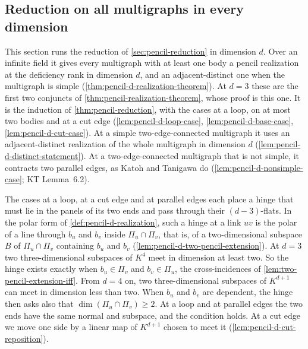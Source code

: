 \subsection{Reduction on all multigraphs in every dimension}
\label{sec:pencil-d-reduction}

This section runs the reduction of \cref{sec:pencil-reduction} in
dimension $d$. Over an infinite field it gives every multigraph with at
least one body a pencil realization at the deficiency rank in dimension
$d$, and an adjacent-distinct one when the multigraph is simple
(\cref{thm:pencil-d-realization-theorem}). At $d = 3$ these are the
first two conjuncts of \cref{thm:pencil-realization-theorem}, whose proof
is this one. It is the induction of \cref{thm:pencil-reduction}, with
the cases at a loop, on at most two bodies and at a cut edge
(\cref{lem:pencil-d-loop-case}, \cref{lem:pencil-d-base-case},
\cref{lem:pencil-d-cut-case}). At a simple two-edge-connected multigraph
it uses an adjacent-distinct realization of the whole multigraph in
dimension $d$ (\cref{lem:pencil-d-distinct-statement}). At a
two-edge-connected multigraph that is not simple, it contracts two
parallel edges, as Katoh and Tanigawa do
(\cref{lem:pencil-d-nonsimple-case}; KT Lemma~6.2).

The cases at a loop, at a cut edge and at parallel edges each place a
hinge that must lie in the panels of its two ends and pass through
their $(d-3)$-flats. In the polar form of \cref{def:pencil-d-realization},
such a hinge at a link $uv$ is the polar of a line through $b_u$ and
$b_v$ inside $\Pi_u \cap \Pi_v$, that is, of a two-dimensional subspace
$B$ of $\Pi_u \cap \Pi_v$ containing $b_u$ and $b_v$
(\cref{lem:pencil-d-two-pencil-extension}). At $d = 3$ two
three-dimensional subspaces of $K^4$ meet in dimension at least two. So
the hinge exists exactly when $b_u \in \Pi_v$ and $b_v \in \Pi_u$, the
cross-incidences of \cref{lem:two-pencil-extension-iff}. From $d = 4$
on, two three-dimensional subspaces of $K^{d+1}$ can meet in dimension
less than two. When $b_u$ and $b_v$ are dependent, the hinge then asks
also that $\dim(\Pi_u \cap \Pi_v) \ge 2$. At a loop and at
parallel edges the two ends have the same normal and subspace, and the
condition holds. At a cut edge we move one side by a linear map of
$K^{d+1}$ chosen to meet it (\cref{lem:pencil-d-cut-reposition}).

